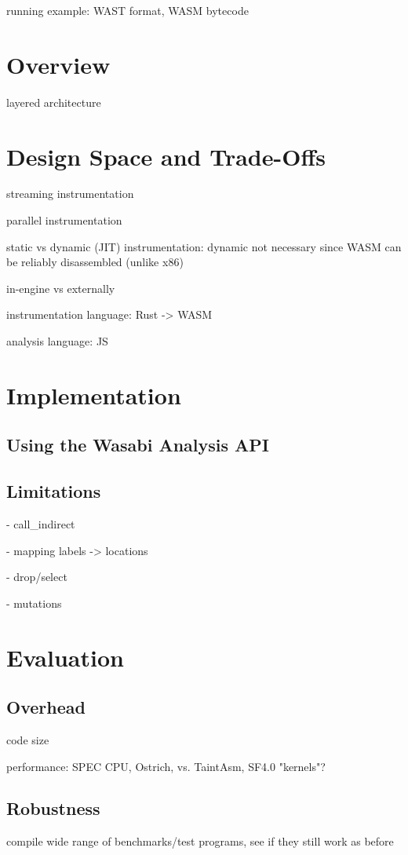 \documentclass[sigplan,review,anonymous]{acmart}\settopmatter{printfolios=true,printccs=false,printacmref=false}
\newcommand{\name}{Wasabi}
\begin{document}
running example: WAST format, WASM bytecode

\newpage
\section{Overview}

layered architecture

\newpage
\section{Design Space and Trade-Offs}
streaming instrumentation

parallel instrumentation

static vs dynamic (JIT) instrumentation: dynamic not necessary since WASM can be reliably disassembled (unlike x86)

in-engine vs externally

instrumentation language: Rust -> WASM

analysis language: JS

\newpage
\section{Implementation}

\subsection{Using the \name{} Analysis API}

\subsection{Limitations}
- call\_indirect

- mapping labels -> locations

- drop/select

- mutations

\newpage
\section{Evaluation}

\subsection{Overhead}
code size

performance: SPEC CPU, Ostrich, vs. TaintAsm, SF4.0 "kernels"?

\subsection{Robustness}
compile wide range of benchmarks/test programs, see if they still work as before
\end{document}
